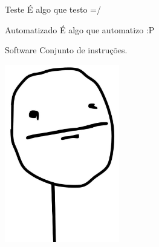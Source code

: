 \begin{frame}{\subsecname}
  \begin{block}{Teste}
    É algo que testo =/
  \end{block}
  \pause

  \begin{block}{Automatizado}
    É algo que automatizo :P
  \end{block}
  \pause

  \begin{block}{Software}
    Conjunto de instruções.
  \end{block}
  \pause
\end{frame}

\begin{frame}{\subsecname}
  \begin{center}
    \includegraphics[width=5cm]{images/pokerface}
  \end{center}
\end{frame}
